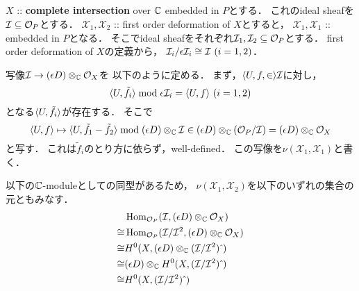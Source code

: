 \documentclass[a4paper]{jsarticle}
\newcommand{\defX}{\mathcal{X}}
\begin{document}
    \subsection{\tp{$\nu(\defX_1, \defX_2)$}{v(X1,X2)}}
    \begin{Def}
        $X$ :: \textbf{complete intersection} over $\mathbb{C}$ embedded in $P$とする．
        これのideal sheafを$\mathcal{I} \subseteq \mathcal{O}_P$とする．
        $\defX_1, \defX_2$ :: first order deformation of $X$とすると，
        $\defX_1, \defX_1$ :: embedded in $P$となる．
        そこでideal sheafをそれぞれ$\mathcal{I}_1, \mathcal{I}_2 \subseteq \mathcal{O}_P$とする．
        first order deformation of $X$の定義から，
        $\shI_i/\epsilon \shI_i \iso \shI \ (i=1,2)$．

        写像$\mathcal{I} \to (\epsilon D) \otimes_{\mathbb{C}} \mathcal{O}_X$を
        以下のように定める．
        まず，$\langle U, f,\in \rangle \mathcal{I}$に対し，
        \[ \langle U,\tilde{f}_i \rangle \bmod \epsilon \mathcal{I}_i=\langle U,f \rangle \ (i=1,2) \]
        となる$\langle U,\tilde{f}_i \rangle$が存在する．
        そこで
        \[
            \langle U,f \rangle
            \mapsto
            \langle U,\tilde{f}_1-\tilde{f}_2 \rangle \bmod (\epsilon D) \otimes_{\mathbb{C}} \mathcal{I}
            \in (\epsilon D) \otimes_{\mathbb{C}} (\mathcal{O}_P/\mathcal{I})=(\epsilon D) \otimes_{\mathbb{C}} \mathcal{O}_X
        \]
        と写す．
        これは$\tilde{f}_i$のとり方に依らず，well-defined．
        この写像を$\nu(\defX_1, \defX_1)$と書く．

        以下の$\mathbb{C}$-moduleとしての同型があるため，
        $\nu(\defX_1, \defX_2)$を以下のいずれの集合の元ともみなす．
        \begin{align*}
            {}&   \operatorname{Hom}_{\mathcal{O}_P}(\mathcal{I}, (\epsilon D) \otimes_{\mathbb{C}} \mathcal{O}_X) \\
            \cong& \operatorname{Hom}_{\mathcal{O}_P}(\mathcal{I}/\mathcal{I}^2, (\epsilon D) \otimes_{\mathbb{C}} \mathcal{O}_X) \\
            \cong& H^0(X, (\epsilon D) \otimes_{\mathbb{C}} (\mathcal{I}/\mathcal{I}^2)\,\hat{}\,) \\
            \cong& (\epsilon D) \otimes_{\mathbb{C}} H^0(X, (\mathcal{I}/\mathcal{I}^2)\,\hat{}\,) \\
            \cong& H^0(X, (\mathcal{I}/\mathcal{I}^2)\,\hat{}\,)
        \end{align*}
    \end{Def}
\end{document}
